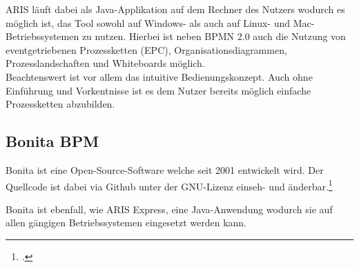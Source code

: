 ARIS läuft dabei als Java-Applikation
auf dem Rechner des Nutzers wodurch es möglich ist, das Tool sowohl auf Windows-
als auch auf Linux- und Mac-Betriebssystemen zu nutzen.
Hierbei ist neben BPMN 2.0 auch die Nutzung von eventgetriebenen
Prozessketten (EPC), Organisationsdiagrammen, 
Prozesslandschaften und Whiteboards möglich.\\

Beachtenswert ist vor allem das intuitive Bedienungskonzept.
Auch ohne Einführung und Vorkentnisse ist es dem Nutzer bereits möglich einfache
Prozessketten abzubilden.


\subsection{Bonita BPM}

Bonita ist eine Open-Source-Software welche seit 2001 entwickelt wird. Der
Quellcode ist dabei via Github unter der GNU-Lizenz einseh- und
änderbar.\footcite{bonitasource}

\begin{figure}[H]
\begin{minipage}{\linewidth}
\begin{center}
\end{center}
\end{minipage}
\end{figure}

Bonita ist ebenfall, wie ARIS Express, eine Java-Anwendung wodurch sie auf allen
gängigen Betriebssystemen eingesetzt werden kann.

